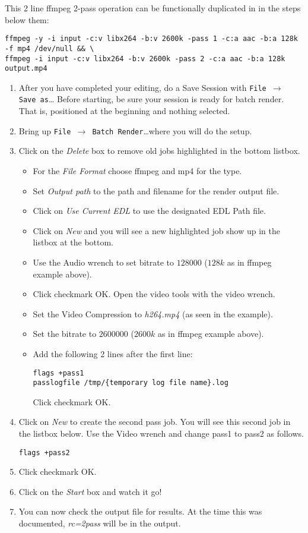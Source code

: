 This 2 line ffmpeg 2-pass operation can be functionally duplicated in \CGG{} in the steps below them:

\begin{lstlisting}[style=sh]
ffmpeg -y -i input -c:v libx264 -b:v 2600k -pass 1 -c:a aac -b:a 128k -f mp4 /dev/null && \
ffmpeg -i input -c:v libx264 -b:v 2600k -pass 2 -c:a aac -b:a 128k output.mp4
\end{lstlisting}

\begin{enumerate}
    \item After you have completed your editing, do a Save Session with \texttt{File $\rightarrow$ Save as}\dots
    Before starting, be sure your session is ready for batch render. That is, positioned at the beginning and nothing selected.
    \item Bring up \texttt{File $\rightarrow$ Batch Render}\dots where you will do the setup.
    \item Click on the \textit{Delete} box  to remove old jobs highlighted in the bottom listbox.
    \begin{itemize}
        \item For the \textit{File Format} choose ffmpeg and mp4 for the type.
        \item Set \textit{Output path} to the path and filename for the render output file.
        \item Click on \textit{Use Current EDL} to use the designated EDL Path file.
        \item Click on \textit{New} and you will see a new highlighted job show up in the listbox at the bottom.
        \item Use the Audio wrench to set bitrate to $128000$ ($128k$ as in ffmpeg example above).
        \item Click checkmark OK.  Open the video tools with the video wrench.
        \item Set the Video Compression to \textit{h264.mp4} (as seen in the example).
        \item Set the bitrate to $2600000$ ($2600k$ as in ffmpeg example above).
        \item Add the following 2 lines after the first line:
        \begin{lstlisting}[style=sh]
flags +pass1
passlogfile /tmp/{temporary log file name}.log
        \end{lstlisting}
        Click checkmark OK.
    \end{itemize}
    \item Click on \textit{New} to create the second pass job.  You will see this second job in the listbox below.
     Use the Video wrench and change pass1 to pass2 as follows.
        \begin{lstlisting}[style=sh]
flags +pass2
        \end{lstlisting}
    \item Click checkmark OK.
    \item Click on the \textit{Start} box and watch it go!
    \item You can now check the output file for results.  At the time this was documented, \textit{rc=2pass} will be
        in the output.
\end{enumerate}

